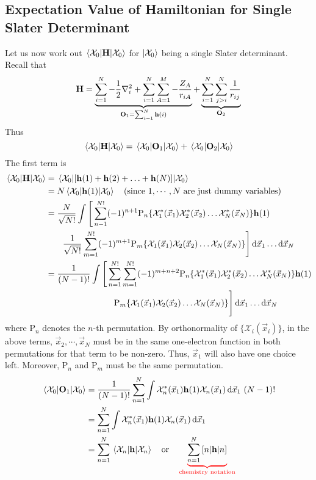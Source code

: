 \documentclass[12pt,a4paper,titlepage]{article}
\newcommand{\trm}[1]{\textrm{#1}} %
\newcommand{\Chi}{\mathcal{X}} %
\newcommand{\perm}{\trm{P}} %
\begin{document}
\subsection{Expectation Value of Hamiltonian for Single Slater Determinant}
Let us now work out $\mel{\Chi_{0}}{\vb{H}}{\Chi_{0}}$ for $\ket{\Chi_{0}}$ being a single Slater determinant. Recall that
\begin{equation}
\vb{H}=\underbrace{\sum_{i=1}^{N}-\frac{1}{2}\nabla_{i}^{2}+\sum_{i=1}^{N}\sum_{A=1}^{M}-\frac{Z_{A}}{r_{iA}}}_{\vb{O}_{1}=\sum_{i=1}^{N}\vb{h}(i)}+\underbrace{\sum_{i=1}^{N}\sum_{j>i}^{N}\frac{1}{r_{ij}}}_{\vb{O}_{2}}
\end{equation}
Thus
\begin{equation}
\mel{\Chi_{0}}{\vb{H}}{\Chi_{0}}=\mel{\Chi_{0}}{\vb{O}_{1}}{\Chi_{0}}+\mel{\Chi_{0}}{\vb{O}_{2}}{\Chi_{0}}
\end{equation}
The first term is
\begin{equation}
\begin{aligned}
\mel{\Chi_{0}}{\vb{H}}{\Chi_{0}}&=\mel{\Chi_{0}}{[\vb{h}(1)+\vb{h}(2)+\ldots+\vb{h}(N)]}{\Chi_{0}}\\
&=N\mel{\Chi_{0}}{\vb{h}(1)}{\Chi_{0}}\qq{(since $1,\cdots,N$ are just dummy variables)}\\
&=\frac{N}{\sqrt{N!}}\int\Bigg[\sum_{n-1}^{N!}(-1)^{n+1}\perm_{n}\{\Chi_{1}^{*}(\vec{x}_{1})\Chi_{2}^{*}(\vec{x}_{2})\ldots\Chi_{N}^{*}(\vec{x}_{N})\}\vb{h}(1)\\
&\quad\quad\frac{1}{\sqrt{N!}}\sum_{m=1}^{N!}(-1)^{m+1}\perm_{m}\{\Chi_{1}(\vec{x}_{1})\Chi_{2}(\vec{x}_{2})\ldots\Chi_{N}(\vec{x}_{N})\}\Bigg]\dd{\vec{x}_{1}}\ldots\dd{\vec{x}_{N}}\\
&=\frac{1}{(N-1)!}\int\Bigg[\sum_{n=1}^{N!}\sum_{m=1}^{N!}(-1)^{m+n+2}\perm_{n}\{\Chi_{1}^{*}(\vec{x}_{1})\Chi_{2}^{*}(\vec{x}_{2})\ldots\Chi_{N}^{*}(\vec{x}_{N})\}\vb{h}(1)\\
&\qquad\qquad\qquad\qquad\perm_{m}\{\Chi_{1}(\vec{x}_{1})\Chi_{2}(\vec{x}_{2})\ldots\Chi_{N}(\vec{x}_{N})\}\Bigg]\dd{\vec{x}_{1}}\ldots\dd{\vec{x}_{N}}
\end{aligned}
\end{equation}
where $\perm_{n}$ denotes the $n$-th permutation. By orthonormality of $\{\Chi_{i}(\vec{x}_{i})\}$, in the above terms, $\vec{x}_{2},\cdots,\vec{x}_{N}$ must be in the same one-electron function in both permutations for that term to be non-zero. Thus, $\vec{x}_{1}$ will also have one choice left. Moreover, $\perm_{n}$ and $\perm_{m}$ must be the same permutation.
\begin{equation}
\begin{aligned}
\mel{\Chi_{0}}{\vb{O}_{1}}{\Chi_{0}}&=\frac{1}{(N-1)!}\sum_{n=1}^{N}\int\Chi_{n}^{*}(\vec{x}_{1})\vb{h}(1)\Chi_{n}(\vec{x}_{1})\dd{\vec{x}_{1}}\,(N-1)!\\
&=\sum_{n=1}^{N}\int\Chi_{n}^{*}(\vec{x}_{1})\vb{h}(1)\Chi_{n}(\vec{x}_{1})\dd{\vec{x}_{1}}\\
&=\sum_{n=1}^{N}\mel{\Chi_{n}}{\vb{h}}{\Chi_{n}}\qq{or}\color{red}\underbrace{\color{black}\sum_{n=1}^{N}\,[n|\vb{h}|n]}_{\trm{chemistry notation}}
\end{aligned}
\end{equation}
\end{document}
